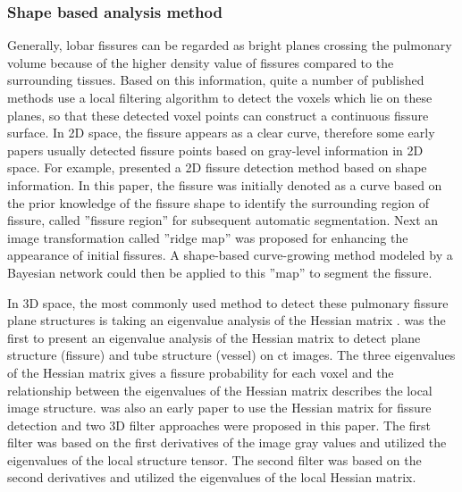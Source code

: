 \subsubsection{Shape based analysis method}
Generally, lobar fissures can be regarded as bright planes crossing the pulmonary volume because of the higher density value of fissures compared to the surrounding tissues. Based on this information, quite a number of published methods use a local filtering algorithm to detect the voxels which lie on these planes, so that these detected voxel points can construct a continuous fissure surface. In 2D space, the fissure appears as a clear curve, therefore some early papers usually detected fissure points based on gray-level information in 2D space. For example, \cite{wang2004shape,wang2006pulmonary} presented a 2D fissure detection method based on shape information. In this paper, the fissure was initially denoted as a curve based on the prior knowledge of the fissure shape to identify the surrounding region of fissure, called ''fissure region'' for subsequent automatic segmentation. Next an image transformation called ''ridge map'' was proposed for enhancing the appearance of initial fissures. A shape-based curve-growing method modeled by a Bayesian network could then be applied to this ''map'' to segment the fissure.

In 3D space, the most commonly used method to detect these pulmonary fissure plane structures is taking an eigenvalue analysis of the Hessian matrix \citep{frangi1998multiscale,wiemker2005unsupervised,kitasaka2006recognition,ochs2007automated,van2008supervised,lassen2011interactive,lassen2013automatic,ross2010automatic,doel2012pulmonary}. \cite{frangi1998multiscale} was the first to present an eigenvalue analysis of the Hessian matrix to detect plane structure (fissure) and tube structure (vessel) on \gls{ct} images. The three eigenvalues of the Hessian matrix gives a fissure probability for each voxel and the relationship between the eigenvalues of the Hessian matrix describes the local image structure. \cite{wiemker2005unsupervised} was also an early paper to use the Hessian matrix for fissure detection and two 3D filter approaches were proposed in this paper. The first filter was based on the first derivatives of the image gray values and utilized the eigenvalues of the local structure tensor. The second filter was based on the second derivatives and utilized the eigenvalues of the local Hessian matrix. 

